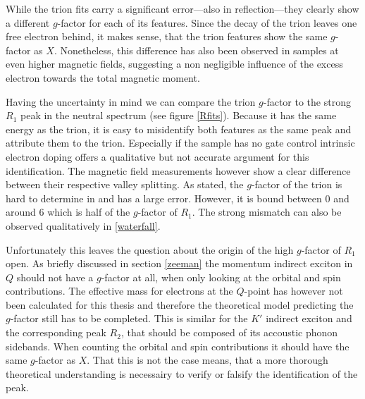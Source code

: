 While the trion fits carry a significant error---also in reflection---they clearly show a different $g$-factor for each of its features. Since the decay of the trion leaves one free electron behind, it makes sense, that the trion features show the same $g$-factor as $X$. Nonetheless, this difference has also been observed in \ws samples at even higher magnetic fields, suggesting a non negligible influence of the excess electron towards the total magnetic moment\cite{plechinger_excitonic_2016}.

Having the uncertainty in mind we can compare the trion $g$-factor to the strong $R_1$ peak in the neutral spectrum (see figure \ref{Rfits}). Because it has the same energy as the trion, it is easy to misidentify both features as the same peak and attribute them to the trion. Especially if the sample has no gate control intrinsic electron doping offers a qualitative but not accurate argument for this identification. The magnetic field measurements however show a clear difference between their respective valley splitting. As stated, the $g$-factor of the trion is hard to determine in \pl and has a large error. However, it is bound between 0 and around 6 which is half of the $g$-factor of $R_1$. The strong mismatch can also be observed qualitatively in \ref{waterfall}.

Unfortunately this leaves the question about the origin of the high $g$-factor of $R_1$ open. As briefly discussed in section \ref{zeeman} the momentum indirect exciton in $Q$ should not have a $g$-factor at all, when only looking at the orbital and spin contributions. The effective mass for electrons at the $Q$-point has however not been calculated for this thesis and therefore the theoretical model predicting the $g$-factor still has to be completed. This is similar for the $K'$ indirect exciton and the corresponding peak $R_2$, that should be composed of its accoustic phonon sidebands. When counting the orbital and spin contributions it should have the same $g$-factor as $X$. That this is not the case means, that a more thorough theoretical understanding is necessairy to verify or falsify the identification of the peak.


